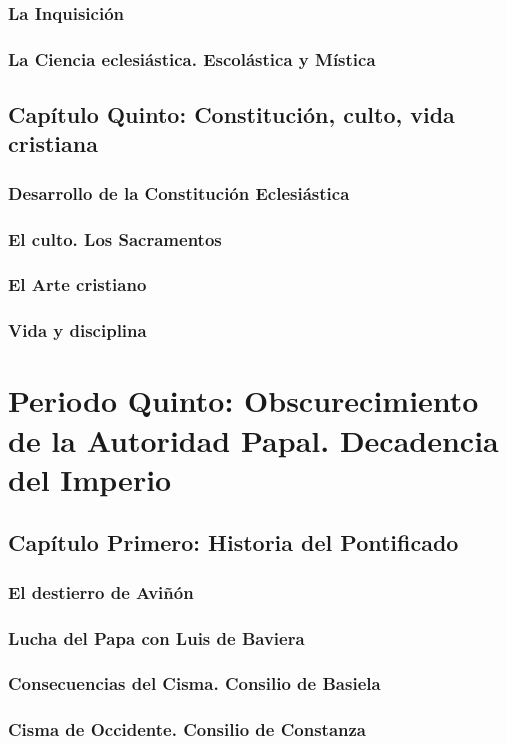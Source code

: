 \raggedbottom{} \documentclass[12pt]{book}
\begin{document}
\section{La Inquisición}
\section{La Ciencia eclesiástica. Escolástica y Mística}
\chapter{Capítulo Quinto: Constitución, culto, vida cristiana}
\section{Desarrollo de la Constitución Eclesiástica}
\section{El culto. Los Sacramentos}
\section{El Arte cristiano}
\section{Vida y disciplina}
\part{Periodo Quinto: Obscurecimiento de la Autoridad Papal. Decadencia del Imperio}
\chapter{Capítulo Primero: Historia del Pontificado}
\section{El destierro de Aviñón}
\section{Lucha del Papa con Luis de Baviera}
\section{Consecuencias del Cisma. Consilio de Basiela}
\section{Cisma de Occidente. Consilio de Constanza}
\end{document}
